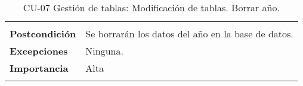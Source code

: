 \begin{longtable}[H]{@{}ll@{}}
\begin{minipage}[t]{0.71\columnwidth}
\end{minipage}\tabularnewline
\begin{minipage}[t]{0.23\columnwidth}\raggedright\strut
\textbf{Postcondición}\strut
\end{minipage} & \begin{minipage}[t]{0.71\columnwidth}\raggedright\strut
Se borrarán los datos del año en la base de datos.\strut
\end{minipage}\tabularnewline
\begin{minipage}[t]{0.23\columnwidth}\raggedright\strut
\textbf{Excepciones}\strut
\end{minipage} & \begin{minipage}[t]{0.71\columnwidth}\raggedright\strut
Ninguna. \strut
\end{minipage}\tabularnewline
\begin{minipage}[t]{0.23\columnwidth}\raggedright\strut
\textbf{Importancia}\strut
\end{minipage} & \begin{minipage}[t]{0.71\columnwidth}\raggedright\strut
Alta\strut
\end{minipage}\tabularnewline
\bottomrule
\caption{CU-07 Gestión de tablas: Modificación de tablas. Borrar año.}
\end{longtable}

